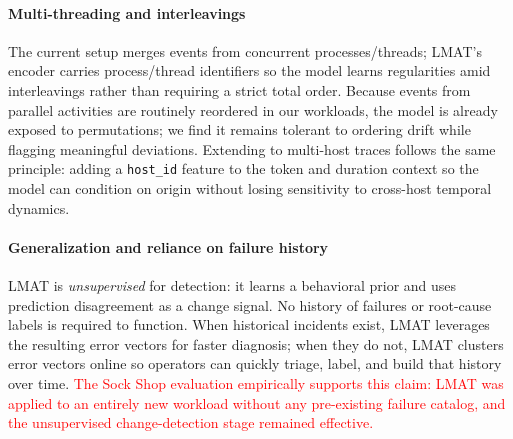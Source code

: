 \documentclass[preprint,12pt]{elsarticle}
\begin{document}
\paragraph{Multi-threading and interleavings}
The current setup merges events from concurrent processes/threads; LMAT’s encoder carries process/thread identifiers so the model learns regularities amid interleavings rather than requiring a strict total order. Because events from parallel activities are routinely reordered in our workloads, the model is already exposed to permutations; we find it remains tolerant to ordering drift while flagging meaningful deviations. Extending to multi-host traces follows the same principle: adding a \texttt{host\_id} feature to the token and duration context so the model can condition on origin without losing sensitivity to cross-host temporal dynamics.


\paragraph{Generalization and reliance on failure history}
LMAT is \emph{unsupervised} for detection: it learns a behavioral prior and uses prediction disagreement as a change signal. No history of failures or root-cause labels is required to function. When historical incidents exist, LMAT leverages the resulting error vectors for faster diagnosis; when they do not, LMAT clusters error vectors online so operators can quickly triage, label, and build that history over time. \textcolor{red}{The Sock Shop evaluation empirically supports this claim: LMAT was applied to an entirely new workload without any pre-existing failure catalog, and the unsupervised change-detection stage remained effective.}
\end{document}

